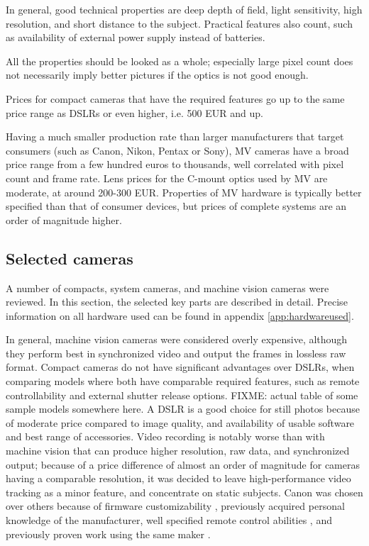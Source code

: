 In general, good technical properties are deep depth of field, light sensitivity, high resolution, and short distance to the subject.
Practical features also count, such as availability of external power supply instead of batteries.

All the properties should be looked as a whole; especially large pixel count does not necessarily imply better pictures if the optics is not good enough.

Prices for compact cameras that have the required features go up to the same price range as DSLRs or even higher, i.e. 500 EUR and up.

Having a much smaller production rate than larger manufacturers that target consumers (such as Canon, Nikon, Pentax or Sony), MV cameras have a broad price range from a few hundred euros to thousands, well correlated with pixel count and frame rate.
Lens prices for the C-mount optics used by MV are moderate, at around 200-300 EUR.
Properties of MV hardware is typically better specified than that of consumer devices, but prices of complete systems are an order of magnitude higher.



\subsection{Selected cameras} %

A number of compacts, system cameras, and machine vision cameras were reviewed.
In this section, the selected key parts are described in detail.
Precise information on all hardware used can be found in appendix \ref{app:hardwareused}.

In general, machine vision cameras were considered overly expensive, although they perform best in synchronized video and output the frames in lossless raw format.
Compact cameras do not have significant advantages over DSLRs, when comparing models where both have comparable required features, such as remote controllability and external shutter release options.
{ \color{red} FIXME: actual table of some sample models somewhere here. }
A DSLR is a good choice for still photos because of moderate price compared to image quality, and availability of usable software and best range of accessories.
Video recording is notably worse than with machine vision that can produce higher resolution, raw data, and synchronized output;
because of a price difference of almost an order of magnitude for cameras having a comparable resolution, it was decided to leave high-performance video tracking as a minor feature, and concentrate on static subjects.
Canon was chosen over others because of firmware customizability \cite{magiclantern}, previously acquired personal knowledge of the manufacturer, well specified remote control abilities \cite{canonedsdk}, and previously proven work using the same maker \cite{ir-ltd,ten24,capturelab,agisoftforum}.

